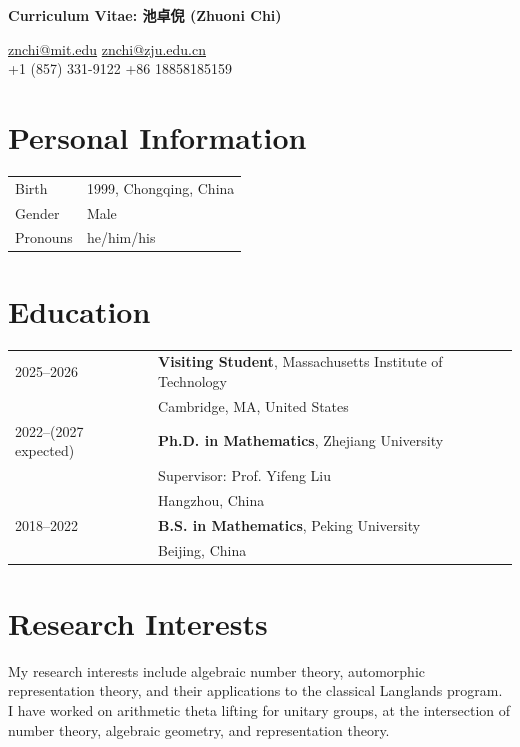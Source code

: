 \documentclass[11pt,a4paper]{ctexart}
\begin{document}
\begin{center}
    {\selectfont\Large\bfseries Curriculum Vitae: 池卓倪 (Zhuoni Chi)}
\end{center}
\vspace{-0.35em}

\href{mailto:znchi@mit.edu}{znchi@mit.edu} \hfill \href{mailto:znchi@zju.edu.cn}{znchi@zju.edu.cn}\\
+1 (857) 331-9122 \hfill +86 18858185159

\vspace{0.2em}

\section{Personal Information}
\begin{tabularx}{\textwidth}{L{1.4in}Y}
Birth   & 1999, Chongqing, China \\
Gender  & Male \\
Pronouns & he/him/his
\end{tabularx}

\section{Education}
\begin{tabularx}{\textwidth}{L{1.65in}Y}
2025--2026 &
\textbf{Visiting Student}, Massachusetts Institute of Technology \\
& Cambridge, MA, United States \\[0.15em]

2022--(2027 expected) &
\textbf{Ph.D. in Mathematics}, Zhejiang University \\
& Supervisor: Prof. Yifeng Liu \\
& Hangzhou, China \\[0.15em]

2018--2022 &
\textbf{B.S. in Mathematics}, Peking University \\
& Beijing, China \\
\end{tabularx}

\section{Research Interests}
My research interests include algebraic number theory, automorphic representation theory, and their applications to the classical Langlands program. I have worked on arithmetic theta lifting for unitary groups, at the intersection of number theory, algebraic geometry, and representation theory.
\end{document}
